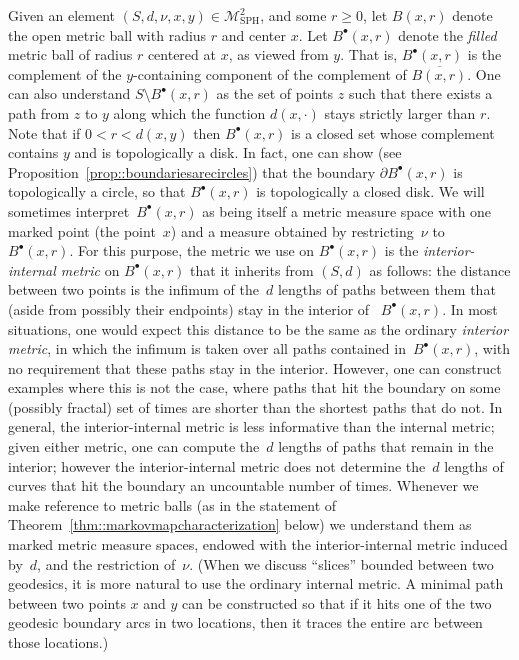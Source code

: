 \documentclass[JEP,XML,SOM,Unicode]{cedram}
\let\mathcal\mathscr
\newcommand{\sbullet}{{\scriptscriptstyle\bullet}}
\theoremstyle{plain}
\numberwithin{theorem}{section}
\theoremstyle{definition}
\newcommand\gmsspace{{\mathcal M}_{\mathrm{SPH}}}
\let\ol\overline
\newcommand{\fb}[2]{B^\sbullet(#1,#2)}
\begin{document}
Given an element $(S, d, \nu, x, y) \in \gmsspace^2$, and some $r \geq 0$, let $B(x,r)$ denote the open metric ball with radius $r$ and center $x$. Let $\fb{x}{r}$ denote the \emph{filled} metric ball of radius $r$ centered at $x$, as viewed from $y$. That is, $\fb{x}{r}$ is the complement of the $y$-containing component of the complement of $\ol{B(x,r)}$. One can also understand $S \setminus \fb{x}{r}$ as the set of points $z$ such that there exists a path from $z$ to $y$ along which the function $d(x, \cdot)$ stays strictly larger than $r$. Note that if $0 < r < d(x,y)$ then $\fb{x}{r}$ is a closed set whose complement contains $y$ and is topologically a disk. In fact, one can show (see Proposition~\ref{prop::boundariesarecircles}) that the boundary $\partial \fb{x}{r}$ is topologically a circle, so that $\fb{x}{r}$ is topologically a closed disk. We will sometimes interpret~$\fb{x}{r}$ as being itself a metric measure space with one marked point (the point~$x$) and a measure obtained by restricting~$\nu$ to~$\fb{x}{r}$. For this purpose, the metric we use on $\fb{x}{r}$ is the \emph{interior-internal metric} on $\fb{x}{r}$ that it inherits from $(S,d)$ as follows: the distance between two points is the infimum of the~$d$ lengths of paths between them that (aside from possibly their endpoints) stay in the interior of~ $\fb{x}{r}$. In most situations, one would expect this distance to be the same as the ordinary \emph{interior metric}, in which the infimum is taken over all paths contained in~$\fb{x}{r}$, with no requirement that these paths stay in the interior. However, one can construct examples where this is not the case, \ie where paths that hit the boundary on some (possibly fractal) set of times are shorter than the shortest paths that do not. In general, the interior-internal metric is less informative than the internal metric; given either metric, one can compute the~$d$ lengths of paths that remain in the interior; however the interior-internal metric does not determine the~$d$ lengths of curves that hit the boundary an uncountable number of times. Whenever we make reference to metric balls (as in the statement of Theorem~\ref{thm::markovmapcharacterization} below) we understand them as marked metric measure spaces, endowed with the interior-internal metric induced by~$d$, and the restriction of~$\nu$. (When we discuss ``slices'' bounded between two geodesics, it is more natural to use the ordinary internal metric. A minimal path between two points $x$ and $y$ can be constructed so that if it hits one of the two geodesic boundary arcs in two locations, then it traces the entire arc between those locations.)
\end{document}
